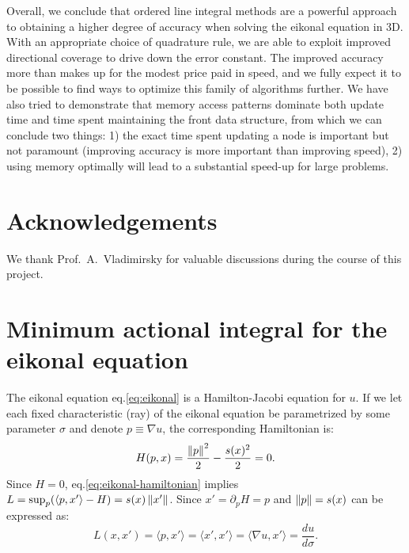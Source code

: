 \documentclass[smallcondensed]{svjour3}
\begin{document}
Overall, we conclude that ordered line integral methods are a powerful
approach to obtaining a higher degree of accuracy when solving the
eikonal equation in 3D. With an appropriate choice of quadrature rule,
we are able to exploit improved directional coverage to drive down the
error constant. The improved accuracy more than makes up for the
modest price paid in speed, and we fully expect it to be possible to
find ways to optimize this family of algorithms further. We have also
tried to demonstrate that memory access patterns dominate both update
time and time spent maintaining the front data structure, from which
we can conclude two things: 1) the exact time spent updating a node is
important but not paramount (improving accuracy is more important than
improving speed), 2) using memory optimally will lead to a substantial
speed-up for large problems.

\section{Acknowledgements}

We thank Prof.\ A.\ Vladimirsky for valuable discussions during the
course of this project.

\appendix

\section[Minimum action integral]{Minimum actional integral for the
  eikonal equation}\label{sec:minimum-action-integral} The eikonal
equation eq.\@ \ref{eq:eikonal} is a Hamilton-Jacobi equation for
$u$. If we let each fixed characteristic (ray) of the eikonal equation
be parametrized by some parameter $\sigma$ and denote
$p \equiv \nabla u$, the corresponding Hamiltonian is:
\begin{equation}
  \label{eq:eikonal-hamiltonian}
  H{(p, x)} = \frac{\left\|p\right\|^2}{2} - \frac{s(x)^2}{2} = 0.
\end{equation}
Since $H = 0$, eq.\@ \ref{eq:eikonal-hamiltonian} implies
$L = \sup_p (\langle p, x' \rangle - H) = s(x) \left\|x'\right\|$. Since
$x' = \partial_p H = p$ and $\left\|p\right\| = s(x)$ can be expressed as:
\begin{equation}
  \label{eq:eikonal-lagrangian}
  L(x, x') = \langle p, x'\rangle = \langle x', x'\rangle = \langle \nabla u, x' \rangle = \frac{du}{d\sigma}.
\end{equation}
\end{document}
